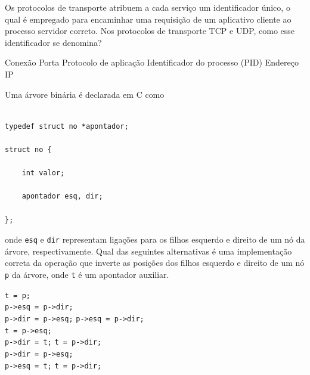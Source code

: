 \documentclass[12pt, addpoints]{exam}
\begin{document}
\begin{questions}
\question

Os protocolos de transporte atribuem a cada serviço um identificador único, o qual é empregado para encaminhar uma requisição de um aplicativo cliente ao processo servidor correto. Nos protocolos de transporte TCP e UDP, como esse identificador se denomina?
\begin{choices}
\choice Conexão
\choice Porta
\choice Protocolo de aplicação
\choice Identificador do processo (PID)
\choice Endereço IP
\end{choices}

\question

Uma árvore binária é declarada em C como



\begin{verbatim}

typedef struct no *apontador;

struct no {

    int valor;

    apontador esq, dir;

};

\end{verbatim}



onde \texttt{esq} e \texttt{dir} representam ligações para os filhos esquerdo e direito de um nó da árvore, respectivamente. Qual das seguintes alternativas é uma implementação correta da operação que inverte as posições dos filhos esquerdo e direito de um nó \texttt{p} da árvore, onde \texttt{t} é um apontador auxiliar.


\begin{choices}
\choice \texttt{t = p;} \\

          \texttt{p->esq = p->dir;} \\

          \texttt{p->dir = p->esq;}
\choice \texttt{p->esq = p->dir;} \\

          \texttt{t = p->esq;} \\

          \texttt{p->dir = t;}
\choice \texttt{t = p->dir;} \\

          \texttt{p->dir = p->esq;} \\

          \texttt{p->esq = t;}
\choice \texttt{t = p->dir;} \\


\end{choices}
\end{questions}
\end{document}
